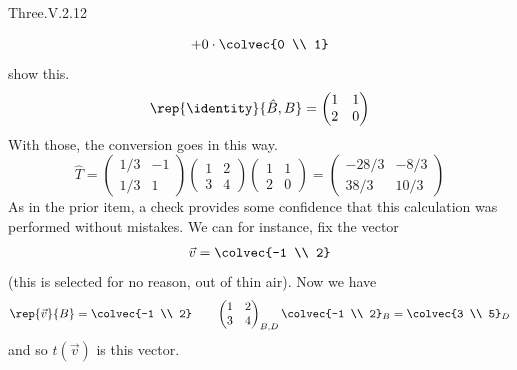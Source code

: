 \begin{ans}{Three.V.2.12}
\begin{exparts}
\begin{equation*}
                  +0\cdot\colvec{0 \\ 1}
      \end{equation*}
      show this.
      \begin{equation*}
        \rep{\identity}{\hat{B},B}=\begin{pmatrix}
          1  &1  \\
          2  &0
        \end{pmatrix}
      \end{equation*}
      With those, the conversion goes in this way.
      \begin{equation*}
        \hat{T}=\begin{pmatrix}
          1/3  &-1  \\
          1/3  &1
        \end{pmatrix}
        \begin{pmatrix}
          1  &2  \\
          3  &4
        \end{pmatrix}
        \begin{pmatrix}
          1  &1  \\
          2  &0
        \end{pmatrix}
        =\begin{pmatrix}
          -28/3  &-8/3  \\
          38/3   &10/3
        \end{pmatrix}
      \end{equation*}
      As in the prior item, a check provides some confidence that this
      calculation was performed without mistakes.
      We can for instance, fix the vector
      \begin{equation*}
        \vec{v}=\colvec{-1 \\ 2}
      \end{equation*}
      (this is selected for no reason, out of thin air).
      Now we have
      \begin{equation*}
        \rep{\vec{v}}{B}=\colvec{-1 \\ 2}
        \qquad
        \begin{pmatrix}
          1  &2  \\
          3  &4
        \end{pmatrix}_{B,D}
        \colvec{-1  \\ 2}_{B}
        =\colvec{3  \\ 5}_D
      \end{equation*}
      and so $t(\vec{v})$ is this vector.
      \begin{equation*}

\end{equation*}
\end{exparts}
\end{ans}
